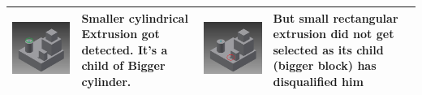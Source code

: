 \begin{longtable}{ | C{0.25\textwidth}  L{0.25\textwidth} || C{0.25\textwidth}  L{0.25\textwidth}|}
%
%

\includegraphics[scale=0.236]{..//Common/images//defeat7.png} &
Smaller cylindrical Extrusion got detected. It’s a child of Bigger cylinder.  & 
\includegraphics[scale=0.236]{..//Common/images//defeat8.png} & 
But small rectangular extrusion did not get selected as its child (bigger block) has disqualified him\\
\hline


\end{longtable}

